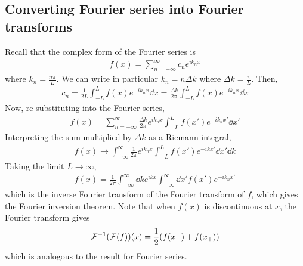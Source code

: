 \subsection{Converting Fourier series into Fourier transforms}
Recall that the complex form of the Fourier series is
\begin{align*}
	f(x) = \sum_{n=-\infty}^\infty c_n e^{ik_n x}
\end{align*}
where $k_n = \frac{n\pi}{L}$.
We can write in particular $k_n = n \Delta k$ where $\Delta k = \frac{\pi}{L}$.
Then,
\begin{align*}
	c_n = \frac{1}{2L} \int_{-L}^L f(x) e^{-ik_n x} \dd{x} = \frac{\Delta k}{2\pi} \int_{-L}^L f(x) e^{-ik_n x}\dd{x}
\end{align*}
Now, re-substituting into the Fourier series,
\begin{align*}
	f(x) = \sum_{n=-\infty}^\infty \frac{\Delta k}{2\pi} e^{i k_n x} \int_{-L}^L f(x') e^{-ik_n x'} \dd{x'}
\end{align*}
Interpreting the sum multiplied by $\Delta k$ as a Riemann integral,
\begin{align*}
	f(x) \to \int_{-\infty}^\infty \frac{1}{2\pi} e^{i k_n x} \int_{-L}^L f(x') e^{-ik x'} \dd{x'} \dd{k}
\end{align*}
Taking the limit $L \to \infty$,
\begin{align*}
	f(x) = \frac{1}{2\pi} \int_{-\infty}^\infty \dd{k} e^{i k x} \int_{-\infty}^\infty \dd{x'} f(x') e^{-ik_n x'}
\end{align*}
which is the inverse Fourier transform of the Fourier transform of $f$, which gives the Fourier inversion theorem.
Note that when $f(x)$ is discontinuous at $x$, the Fourier transform gives
\begin{align*}
	\mathcal F^{-1}(\mathcal F(f))(x) = \frac{1}{2}(f(x_-) + f(x_+))
\end{align*}
which is analogous to the result for Fourier series.

